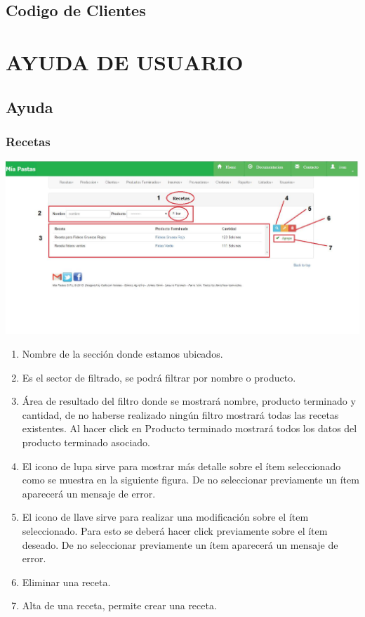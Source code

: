 \documentclass[letterpaper,10pt,english]{sphinxmanual}
\begin{document}
\section{Codigo de Clientes}
\label{codigo clientes:codigo-de-clientes}\label{codigo clientes::doc}

\chapter{{}AYUDA DE USUARIO}
\label{ayuda usuario::doc}\label{ayuda usuario:ayuda-de-usuario}

\section{Ayuda}
\label{ayuda usuario:ayuda}

\subsection{{}Recetas}
\label{recetas::doc}\label{recetas:recetas}
\includegraphics{rece_ini.jpg}
\begin{enumerate}
\item {} 
Nombre de la sección donde estamos ubicados.

\item {} 
Es el sector de filtrado, se podrá filtrar por nombre o producto.

\item {} 
Área de resultado del filtro donde se mostrará nombre, producto terminado y cantidad, de no haberse realizado ningún filtro mostrará todas las recetas existentes. Al hacer click en Producto terminado mostrará todos los datos del producto terminado asociado.

\item {} 
El icono de lupa sirve para mostrar más detalle sobre el ítem seleccionado como se muestra en la siguiente figura. De no seleccionar previamente un ítem aparecerá un mensaje de error.

\item {} 
El icono de llave sirve para realizar una modificación sobre el ítem seleccionado. Para esto se deberá hacer click previamente sobre el ítem deseado. De no seleccionar previamente un ítem aparecerá un mensaje de error.

\item {} 
Eliminar una receta.

\item {} 
Alta de una receta, permite crear una receta.

\end{enumerate}
\end{document}

